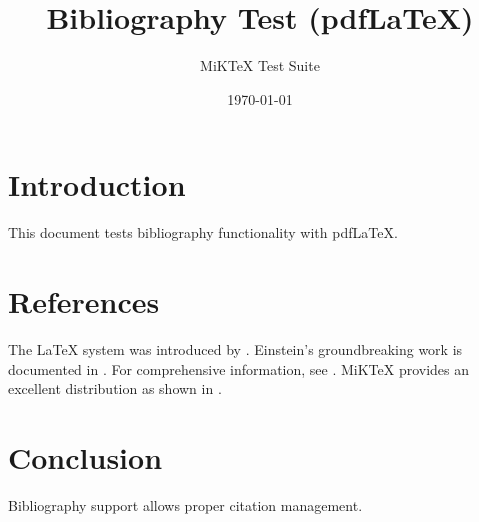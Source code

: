 \documentclass{article}
\title{Bibliography Test (pdfLaTeX)}
\author{MiKTeX Test Suite}
\date{\today}
\begin{document}
\maketitle

\section{Introduction}
This document tests bibliography functionality with pdfLaTeX.

\section{References}
The \LaTeX{} system was introduced by \cite{lamport1994}. 
Einstein's groundbreaking work is documented in \cite{einstein1905}.
For comprehensive information, see \cite{goossens1994}.
MiKTeX provides an excellent distribution as shown in \cite{miktex2023}.

\section{Conclusion}
Bibliography support allows proper citation management.



\end{document}
